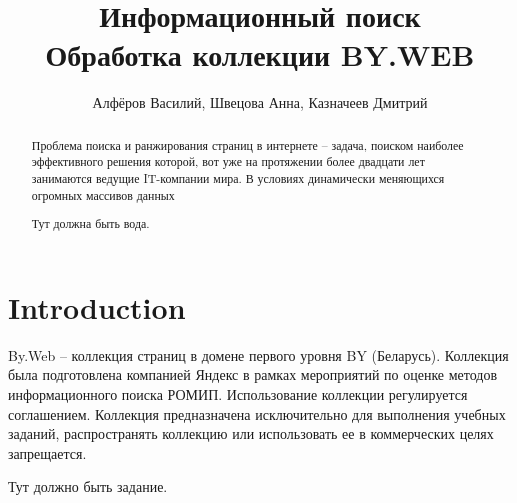 \documentclass[twocolumn]{article}
\title{Информационный поиск\\ Обработка коллекции BY.WEB}
\author{Алфёров Василий, Швецова Анна, Казначеев Дмитрий}
\begin{document}
\maketitle        

\begin{abstract}
	Проблема поиска и ранжирования страниц в интернете -- задача, поиском наиболее эффективного решения которой, вот уже на протяжении более двадцати лет занимаются ведущие IT-компании мира. В условиях динамически меняющихся огромных массивов данных 
	
	
	Тут должна быть вода.
\end{abstract}

\section{Introduction}

By.Web -- коллекция страниц в домене первого уровня BY (Беларусь). Коллекция была подготовлена компанией Яндекс в рамках мероприятий по оценке методов информационного поиска РОМИП. Использование коллекции регулируется соглашением. Коллекция предназначена исключительно для выполнения учебных заданий, распространять коллекцию или использовать ее в коммерческих целях запрещается.	

Тут должно быть задание.






\end{document}
